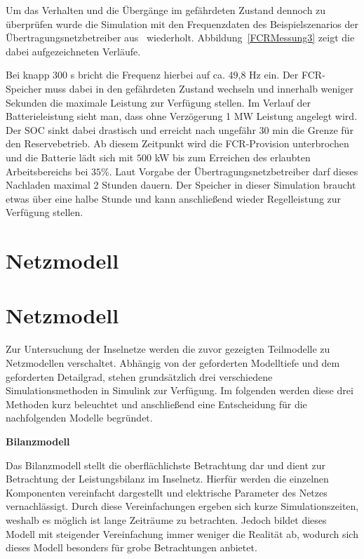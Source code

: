 Um das Verhalten und die Übergänge im gefährdeten Zustand dennoch zu überprüfen wurde die Simulation mit den Frequenzdaten
des Beispielszenarios der Übertragungsnetzbetreiber aus~\parencite[]{Reservebetrieb} wiederholt.
Abbildung~\ref{FCRMessung3} zeigt die dabei aufgezeichneten Verläufe.

Bei knapp 300 s bricht die Frequenz hierbei auf ca. 49,8 Hz ein.
Der FCR-Speicher muss dabei in den gefährdeten Zustand wechseln und innerhalb weniger Sekunden
die maximale Leistung zur Verfügung stellen.
Im Verlauf der Batterieleistung sieht man, dass ohne Verzögerung 1 MW Leistung angelegt wird.
Der SOC sinkt dabei drastisch und erreicht nach ungefähr 30 min die Grenze für den Reservebetrieb.
Ab diesem Zeitpunkt wird die FCR-Provision unterbrochen und die Batterie lädt sich mit $500$ kW 
bis zum Erreichen des erlaubten Arbeitsbereichs bei $35 \%$.
Laut Vorgabe der Übertragungsnetzbetreiber darf dieses Nachladen maximal 2 Stunden dauern.
Der Speicher in dieser Simulation braucht etwas über eine halbe Stunde und kann anschließend wieder
Regelleistung zur Verfügung stellen.



\section{Netzmodell}
\section{Netzmodell}

Zur Untersuchung der Inselnetze werden die zuvor gezeigten Teilmodelle zu Netzmodellen verschaltet. Abhängig von der geforderten Modelltiefe und dem geforderten Detailgrad, stehen grundsätzlich drei verschiedene Simulationsmethoden in Simulink zur Verfügung. Im folgenden werden diese drei Methoden kurz beleuchtet und anschließend eine Entscheidung für die nachfolgenden Modelle begründet.

\textbf{Bilanzmodell}

Das Bilanzmodell stellt die oberflächlichste Betrachtung dar und dient zur Betrachtung der Leistungsbilanz im Inselnetz. Hierfür werden die einzelnen Komponenten vereinfacht dargestellt und elektrische Parameter des Netzes vernachlässigt. Durch diese Vereinfachungen ergeben sich kurze Simulationszeiten, weshalb es möglich ist lange Zeiträume zu betrachten. Jedoch bildet dieses Modell mit steigender Vereinfachung immer weniger die Realität ab, wodurch sich dieses Modell besonders für grobe Betrachtungen anbietet.

